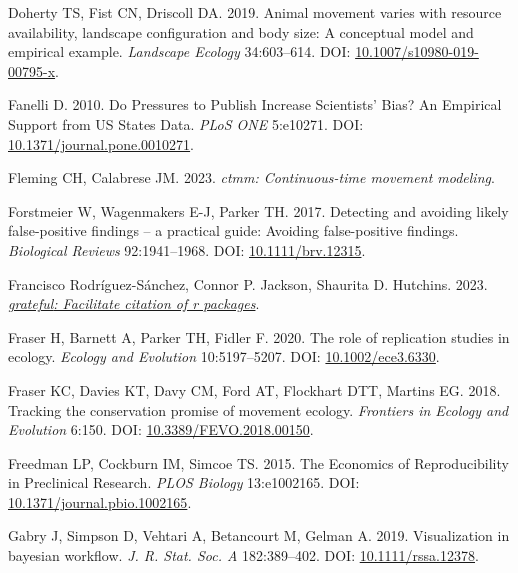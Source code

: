 \documentclass[10pt,a4paper]{article}
\newlength{\cslhangindent}
\newlength{\cslentryspacingunit} %
\newenvironment{CSLReferences}[2] %
 {%
  \setlength{\parindent}{0pt}
  \ifodd #1
  \let\oldpar\par
  \def\par{\hangindent=\cslhangindent\oldpar}
  \fi
  \setlength{\parskip}{#2\cslentryspacingunit}
 }%
 {}
\begin{document}
\begin{CSLReferences}{1}{0}
Doherty TS, Fist CN, Driscoll DA. 2019. Animal movement varies with resource availability, landscape configuration and body size: A conceptual model and empirical example. \emph{Landscape Ecology} 34:603--614. DOI: \href{https://doi.org/10.1007/s10980-019-00795-x}{10.1007/s10980-019-00795-x}.

Fanelli D. 2010. Do {Pressures} to {Publish} {Increase} {Scientists}' {Bias}? {An} {Empirical} {Support} from {US} {States} {Data}. \emph{PLoS ONE} 5:e10271. DOI: \href{https://doi.org/10.1371/journal.pone.0010271}{10.1371/journal.pone.0010271}.

Fleming CH, Calabrese JM. 2023. \emph{{ctmm}: Continuous-time movement modeling}.

Forstmeier W, Wagenmakers E-J, Parker TH. 2017. Detecting and avoiding likely false-positive findings -- a practical guide: {Avoiding} false-positive findings. \emph{Biological Reviews} 92:1941--1968. DOI: \href{https://doi.org/10.1111/brv.12315}{10.1111/brv.12315}.

Francisco Rodríguez-Sánchez, Connor P. Jackson, Shaurita D. Hutchins. 2023. \emph{\href{https://github.com/Pakillo/grateful}{{grateful}: Facilitate citation of r packages}}.

Fraser H, Barnett A, Parker TH, Fidler F. 2020. The role of replication studies in ecology. \emph{Ecology and Evolution} 10:5197--5207. DOI: \href{https://doi.org/10.1002/ece3.6330}{10.1002/ece3.6330}.

Fraser KC, Davies KT, Davy CM, Ford AT, Flockhart DTT, Martins EG. 2018. Tracking the conservation promise of movement ecology. \emph{Frontiers in Ecology and Evolution} 6:150. DOI: \href{https://doi.org/10.3389/FEVO.2018.00150}{10.3389/FEVO.2018.00150}.

Freedman LP, Cockburn IM, Simcoe TS. 2015. The {Economics} of {Reproducibility} in {Preclinical} {Research}. \emph{PLOS Biology} 13:e1002165. DOI: \href{https://doi.org/10.1371/journal.pbio.1002165}{10.1371/journal.pbio.1002165}.

Gabry J, Simpson D, Vehtari A, Betancourt M, Gelman A. 2019. Visualization in bayesian workflow. \emph{J. R. Stat. Soc. A} 182:389--402. DOI: \href{https://doi.org/10.1111/rssa.12378}{10.1111/rssa.12378}.


\end{CSLReferences}
\end{document}
